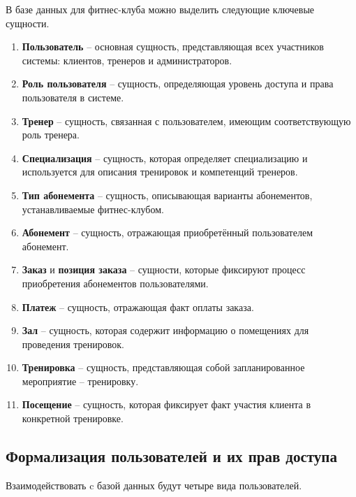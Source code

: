 В базе данных для фитнес-клуба можно выделить следующие ключевые сущности.
\begin{enumerate}[label=\arabic*.]
	\item \textbf{Пользователь} -- основная сущность, представляющая всех участников системы: клиентов, тренеров и администраторов.

	\item \textbf{Роль пользователя} -- сущность, определяющая уровень доступа и права пользователя в системе.

	\item \textbf{Тренер} -- сущность, связанная с пользователем, имеющим соответствующую роль тренера.

	\item \textbf{Специализация} -- сущность, которая определяет специализацию и используется для описания тренировок и компетенций тренеров.

	\item \textbf{Тип абонемента} -- сущность, описывающая варианты абонементов, устанавливаемые фитнес-клубом.

	\item \textbf{Абонемент} -- сущность, отражающая приобретённый пользователем абонемент.

	\item \textbf{Заказ} и \textbf{позиция заказа} -- сущности, которые фиксируют процесс приобретения абонементов пользователями.

	\item \textbf{Платеж} -- сущность, отражающая факт оплаты заказа.

	\item \textbf{Зал} -- сущность, которая содержит информацию о помещениях для проведения тренировок.

	\item \textbf{Тренировка} --  сущность, представляющая собой запланированное мероприятие -- тренировку.

	\item \textbf{Посещение} -- сущность, которая фиксирует факт участия клиента в конкретной тренировке.
\end{enumerate}

\subsection{Формализация пользователей и их прав доступа}

Взаимодействовать c базой данных будут четыре вида пользователей.

